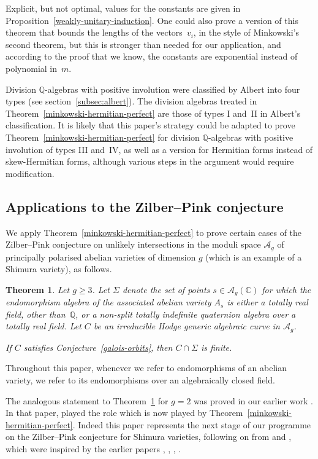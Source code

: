 \documentclass[11pt]{article}
\numberwithin{equation}{section}
\newcommand{\bC}{\mathbb{C}}
\newcommand{\bQ}{\mathbb{Q}}
\newcommand{\cA}{\mathcal{A}}
\newcommand{\Ag}{\mathcal{A}_g}
\newtheorem{theorem}[lemma]{Theorem}
\begin{document}
Explicit, but not optimal, values for the constants are given in Proposition~\ref{weakly-unitary-induction}.
One could also prove a version of this theorem that bounds the lengths of the vectors~$v_i$, in the style of Minkowski's second theorem, but this is stronger than needed for our application, and according to the proof that we know, the constants are exponential instead of polynomial in~$m$.

Division $\bQ$-algebras with positive involution were classified by Albert into four types (see section~\ref{subsec:albert}).
The division algebras treated in Theorem~\ref{minkowski-hermitian-perfect} are those of types I and~II in Albert's classification.
It is likely that this paper's strategy could be adapted to prove Theorem~\ref{minkowski-hermitian-perfect} for division $\bQ$-algebras with positive involution of types III and~IV, as well as a version for Hermitian forms instead of skew-Hermitian forms, although various steps in the argument would require modification.

\subsection{Applications to the Zilber--Pink conjecture} \label{subsec:intro-zp-theorem}

We apply Theorem~\ref{minkowski-hermitian-perfect} to prove certain cases of the Zilber--Pink conjecture on unlikely intersections in the moduli space $\cA_g$ of principally polarised abelian varieties of dimension $g$ (which is an example of a Shimura variety), as follows.

\begin{theorem} \label{main-theorem-zp}
Let $g \geq 3$.
Let $\Sigma$ denote the set of points $s \in \Ag(\bC)$ for which the endomorphism algebra of the associated abelian variety $A_s$ is either a totally real field, other than~$\bQ$, or a non-split totally indefinite quaternion algebra over a totally real field.
Let $C$ be an irreducible Hodge generic algebraic curve in $\Ag$.

If $C$ satisfies Conjecture~\ref{galois-orbits}, then $C \cap \Sigma$ is finite.
\end{theorem}

Throughout this paper, whenever we refer to endomorphisms of an abelian variety, we refer to its endomorphisms over an algebraically closed field.

The analogous statement to Theorem~\ref{main-theorem-zp} for $g=2$ was proved in our earlier work \cite{QRTUI}.
In that paper, \cite[Lem.\,5.7]{QRTUI} played the role which is now played by Theorem~\ref{minkowski-hermitian-perfect}.
Indeed this paper represents the next stage of our programme on the Zilber--Pink conjecture for Shimura varieties, following on from \cite{ExCM} and \cite{QRTUI}, which were inspired by the earlier papers \cite{HP12}, \cite{HP16}, \cite{DR18}, \cite{OrrUI}.
\end{document}
